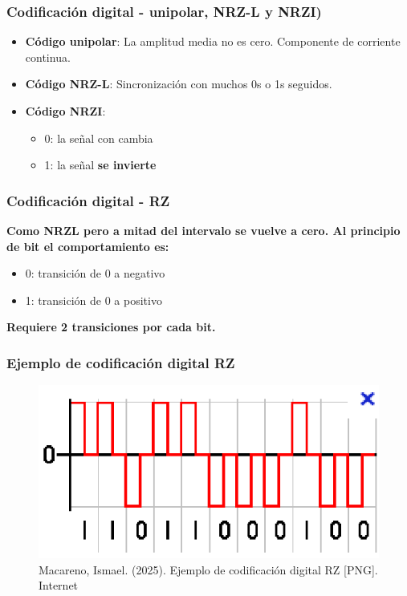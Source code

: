 \documentclass[11pt]{article}
\begin{document}
\subsubsection{Codificación digital - unipolar, NRZ-L y NRZI)}
\label{sec:orga4319b9}
\begin{itemize}
\item \textbf{Código unipolar}: La amplitud media no es cero. Componente de corriente continua.
\item \textbf{Código NRZ-L}: Sincronización con muchos 0s o 1s seguidos.
\item \textbf{Código NRZI}:
\begin{itemize}
\item 0: la señal con cambia
\item 1: la señal \textbf{se invierte}
\end{itemize}
\end{itemize}

\subsubsection{Codificación digital - RZ}
\label{sec:orge4d9a34}
\textbf{Como NRZL pero a mitad del intervalo se vuelve a cero. Al principio de bit el comportamiento es:}
\begin{itemize}
\item 0: transición de 0 a negativo
\item 1: transición de 0 a positivo
\end{itemize}

\textbf{Requiere 2 transiciones por cada bit.}

\subsubsection{Ejemplo de codificación digital RZ}
\label{sec:org28268b5}
\begin{figure}[htbp]
\centering
\includegraphics[width=.9\linewidth]{../apuntes/img/ejemplo-codificacion-rz.png}
\caption{Macareno, Ismael. (2025). Ejemplo de codificación digital RZ [PNG]. Internet}
\end{figure}
\end{document}
